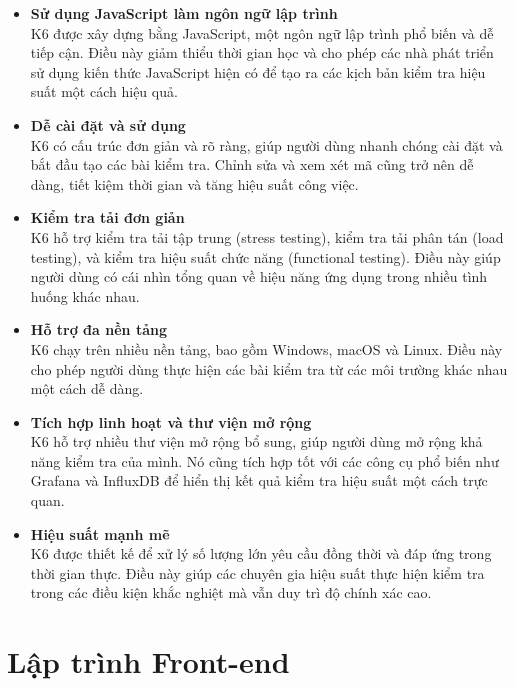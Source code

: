 \begin{itemize}
    \item \textbf{Sử dụng JavaScript làm ngôn ngữ lập trình}\\
    K6 được xây dựng bằng JavaScript, một ngôn ngữ lập trình phổ biến và dễ tiếp cận. Điều này giảm thiểu thời gian học và cho phép các nhà phát triển sử dụng kiến thức JavaScript hiện có để tạo ra các kịch bản kiểm tra hiệu suất một cách hiệu quả.
    \item \textbf{Dễ cài đặt và sử dụng}\\
    K6 có cấu trúc đơn giản và rõ ràng, giúp người dùng nhanh chóng cài đặt và bắt đầu tạo các bài kiểm tra. Chỉnh sửa và xem xét mã cũng trở nên dễ dàng, tiết kiệm thời gian và tăng hiệu suất công việc.
     \item \textbf{Kiểm tra tải đơn giản}\\
     K6 hỗ trợ kiểm tra tải tập trung (stress testing), kiểm tra tải phân tán (load testing), và kiểm tra hiệu suất chức năng (functional testing). Điều này giúp người dùng có cái nhìn tổng quan về hiệu năng ứng dụng trong nhiều tình huống khác nhau.
     \item \textbf{Hỗ trợ đa nền tảng}\\
     K6 chạy trên nhiều nền tảng, bao gồm Windows, macOS và Linux. Điều này cho phép người dùng thực hiện các bài kiểm tra từ các môi trường khác nhau một cách dễ dàng.
     \item \textbf{Tích hợp linh hoạt và thư viện mở rộng}\\
     K6 hỗ trợ nhiều thư viện mở rộng bổ sung, giúp người dùng mở rộng khả năng kiểm tra của mình. Nó cũng tích hợp tốt với các công cụ phổ biến như Grafana và InfluxDB để hiển thị kết quả kiểm tra hiệu suất một cách trực quan.
     \item \textbf{Hiệu suất mạnh mẽ}\\
     K6 được thiết kế để xử lý số lượng lớn yêu cầu đồng thời và đáp ứng trong thời gian thực. Điều này giúp các chuyên gia hiệu suất thực hiện kiểm tra trong các điều kiện khắc nghiệt mà vẫn duy trì độ chính xác cao.
\end{itemize}
\section{Lập trình Front-end}
